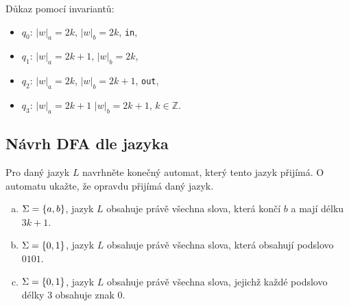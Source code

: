 \begin{multicols}{2}


    Důkaz pomocí invariantů:
    \begin{itemize}[noitemsep]
        \item $q_0$: $|w|_a = 2k$, $|w|_b = 2k$, \texttt{in},
        \item $q_1$: $|w|_a = 2k + 1$, $|w|_b = 2k$,
        \item $q_2$: $|w|_a = 2k$, $|w|_b = 2k + 1$, \texttt{out},
        \item $q_3$: $|w|_a = 2k + 1$ $|w|_b = 2k+ 1$, $k \in \mathbb{Z}$.
    \end{itemize}
\end{multicols}

\subsection{Návrh DFA dle jazyka}
Pro daný jazyk $L$ navrhněte konečný automat, který tento jazyk přijímá. O automatu ukažte, že opravdu přijímá daný jazyk.

\begin{enumerate}[a), noitemsep]
    \item $\Sigma = \left\lbrace a,b \right\rbrace$, jazyk $L$ obsahuje právě všechna slova, která končí $b$ a mají délku $3k+1$.
    \item $\Sigma = \left\lbrace 0,1 \right\rbrace$, jazyk $L$ obsahuje právě všechna slova, která obsahují podslovo $0101$.
    \item $\Sigma = \left\lbrace 0,1 \right\rbrace$, jazyk $L$ obsahuje právě všechna slova, jejichž každé podslovo délky $3$ obsahuje znak $0$.
\end{enumerate}

